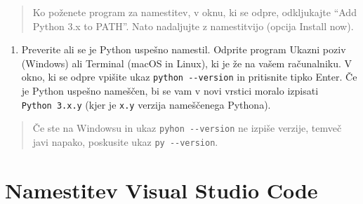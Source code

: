 \documentclass[
]{book}
\providecommand{\tightlist}{%
  \setlength{\itemsep}{0pt}\setlength{\parskip}{0pt}}
\begin{document}
\begin{quote}
Ko poženete program za namestitev, v oknu, ki se odpre, odkljukajte
``Add Python 3.x to PATH''.
Nato nadaljujte z namestitvijo (opcija Install now).
\end{quote}

\begin{enumerate}
\def\labelenumi{\arabic{enumi}.}
\setcounter{enumi}{1}
\tightlist
\item
  Preverite ali se je Python uspešno namestil. Odprite program Ukazni poziv (Windows)
  ali Terminal (macOS in Linux), ki je že na vašem računalniku. V okno, ki se odpre
  vpišite ukaz \texttt{python\ -\/-version} in pritisnite tipko Enter. Če je Python
  uspešno nameščen, bi se vam v novi vrstici moralo izpisati \texttt{Python\ 3.x.y}
  (kjer je \texttt{x.y} verzija nameščenega Pythona).
\end{enumerate}

\begin{quote}
Če ste na Windowsu in ukaz \texttt{pyhon\ -\/-version} ne izpiše verzije, temveč javi napako, poskusite ukaz \texttt{py\ -\/-version}.
\end{quote}

\hypertarget{namestitev-visual-studio-code}{%
\section{Namestitev Visual Studio Code}\label{namestitev-visual-studio-code}}
\end{document}
